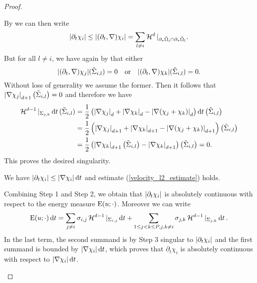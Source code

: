 \begin{proof}
\begin{description}[wide=0pt]
		By  we can then write
		\begin{equation*}
			\abs{ \partial_{ t } \chi_{ i } }
			\leq
			\abs{ ( \partial_{ t } , \nabla ) \chi_{ i } }
			=
			\sum_{ l \neq i }
				\operatorname{\mathcal{H}}^{ d } |_{ \partial_{ \ast } \tilde{ \Omega }_{ i } \cap \partial_{ \ast } \tilde{ \Omega }_{ l } }.
		\end{equation*}
		But for all $ l \neq i $, we have again by  that either 
		\begin{equation*}
			\abs{ ( \partial_{ t } , \nabla ) \chi_{ j } } ( \tilde{ \Sigma }_{ i , l } ) = 0 
			\quad \text{or} \quad
			\abs{ ( \partial_{ t } , \nabla ) \chi_{ k } } ( \tilde{ \Sigma }_{ i , l } ) = 0.
		\end{equation*}
		Without loss of generality we assume the former. 
		Then it follows that $ \abs{ \nabla \chi_{ j } }_{ d + 1 } \left( \tilde{ \Sigma }_{ i , l } \right) = 0 $ and therefore we have
		\begin{align*}
			\operatorname{\mathcal{H}}^{ d - 1 } |_{ \Sigma_{ j , k } } \dd{ t } ( \tilde{ \Sigma }_{ i , l } )
			& =
			\frac{ 1 }{ 2 } \left(
				\abs{ \nabla \chi_{ j } }_{ d }
				+
				\abs{ \nabla \chi_{ k } }_{ d }
				-
				\abs{ \nabla ( \chi_{ j } + \chi_{ k } ) }_{ d }
			\right)
			\dd{ t }
			\left( \tilde{ \Sigma }_{ i , l }\right)
			\\
			& = 
			\frac{ 1 }{ 2 } \left(
				\abs{ \nabla \chi_{ j } }_{ d+1 }
				+
				\abs{ \nabla \chi_{ k } }_{ d +1 }
				-
				\abs{ \nabla ( \chi_{ j } + \chi_{ k } ) }_{ d+ 1 }
			\right) \left( \tilde{ \Sigma }_{ i , l } \right)
			\\
			& = 
			\frac{ 1 }{ 2 } \left( 
				\abs{ \nabla \chi_{ k } }_{ d + 1 } \left( \tilde{ \Sigma } _{ i , l } \right)
				-
				\abs{ \nabla \chi_{ k } }_{ d + 1 } 
			\right)
			\left( \tilde{ \Sigma } _{ i , l } \right)
			= 0.		
		\end{align*}
		This proves the desired singularity.
		
		\item[Step 4:] We have 
		$ \abs{ \partial_{ t } \chi_{ i } } 
		\leq \abs{ \nabla \chi_{ i } } \dd{ t } $ and estimate (\ref{velocity_l2_estimate}) holds.
		
		Combining Step 1 and Step 2, we obtain that $ \abs{ \partial_{ t } \chi_{ i } } $ is absolutely continuous with respect to the energy measure $ \operatorname{E} ( u ; \cdot ) $. Moreover we can write
		\begin{equation*}
			\operatorname{E} ( u ; \cdot ) \dd{ t }
			=
			\sum_{ j \neq i }
				\sigma_{ i , j }
				\operatorname{\mathcal{H}}^{ d - 1 } |_{ \Sigma_{ i , j } }
				\dd{ t }
			+
			\sum_{ 1 \leq j < k \leq P , j, k \neq i }
				\sigma_{ j , k }
				\operatorname{\mathcal{H}}^{ d- 1 } |_{ \Sigma_{ j , k } }
				\dd{ t }.
		\end{equation*}
		In the last term, the second summand is by Step 3 singular to $ \abs{ \partial_{ t } \chi_{ i } } $ and the first summand is bounded by $ \abs{ \nabla \chi_{ i } } \dd{ t } $, which proves that $ \partial_{ t } \chi_{ i } $ is absolutely continuous with respect to $ \abs{ \nabla \chi_{ i } } \dd{ t } $.
		

\end{description}
\end{proof}
